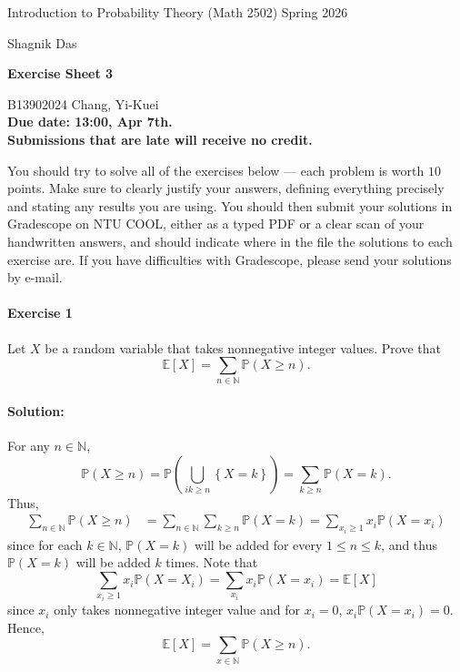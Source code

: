 \documentclass[a4paper,12pt]{article}
\newcommand{\courseTitle}{Introduction to Probability Theory (Math 2502)}
\newcommand{\semester}{Spring 2026}
\newcommand{\instructorA}{Shagnik Das}
\newcommand{\instructorB}{}
\newcommand{\sheetNumber}{3}
\newcommand{\dueDate}{13:00, Apr 7th.}
\newcommand{\lateWarning}{Submissions that are late will receive no credit.}
\newcommand{\buildtitle}[4]{
\begin{flushleft}
{\large
#1
\hfill{}
#2
\par
#3
}
\end{flushleft}
\vskip 4pt
\begin{center}
{\large\bfseries#4\par}
\end{center}
\bigskip
}
\newcommand{\mb}[1]{\mathbb{#1}}
\begin{document}
\buildtitle{\courseTitle{}}{\semester}{\instructorA{} \hfill \instructorB{}}{Exercise Sheet \sheetNumber{}}

\vspace{-0.2in}

\begin{center}

{B13902024 Chang, Yi-Kuei \\ \bf Due date: \dueDate \\ \lateWarning}

\end{center}

\noindent You should try to solve all of the exercises below --- each problem is worth $10$ points. Make sure to clearly justify your answers, defining everything precisely and stating any results you are using. You should then submit your solutions in Gradescope on NTU COOL, either as a typed PDF or a clear scan of your handwritten answers, and should indicate where in the file the solutions to each exercise are. If you have difficulties with Gradescope, please send your solutions by e-mail.

\paragraph{Exercise 1}  Let $X$ be a random variable that takes nonnegative integer values. Prove that
\[ \mb E [X] = \sum_{n \in \mathbb{N}} \mb P (X \ge n). \]

\paragraph{Solution:} For any \(n \in \mathbb{N} \),
\[
	\mathbb{P} (X \ge n) = \mathbb{P} \left( \bigcup_{ik \ge n} \left\{ X = k \right\}   \right) = \sum_{k \ge n} \mathbb{P} (X = k).  
\] 
Thus,
\begin{align*}
	\sum_{n \in \mathbb{N}} \mathbb{P} (X \ge n) &= \sum_{n \in \mathbb{N} } \sum_{k \ge n} \mathbb{P} (X = k) = \sum_{x_i \ge 1} x_i \mathbb{P} (X = x_i)   
\end{align*}
since for each \(k \in \mathbb{N} \), \(\mathbb{P} (X = k)\) will be added for every \(1 \le n \le k\), and thus \(\mathbb{P} (X = k)\) will be added \(k\) times. Note that 
\[
	\sum_{x_i \ge 1} x_i \mathbb{P} (X = X_i) = \sum_{x_i} x_i \mathbb{P} (X = x_i) = \mathbb{E} [X]  
\]    
since \(x_i\) only takes nonnegative integer value and for \(x_i = 0\), \(x_i \mathbb{P} (X = x_i) = 0\). Hence,
\[
	\mathbb{E} [X] = \sum_{x \in \mathbb{N} } \mathbb{P} (X \ge n). 
\] 
\end{document}
